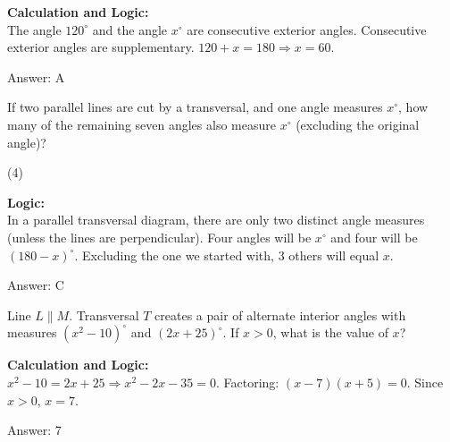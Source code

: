 \documentclass[11pt,paper=a4,answers]{exam}
\begin{document}
\begin{questions}
\begin{solution}
\textbf{Calculation and Logic:} \\
The angle $120^\circ$ and the angle $x^\circ$ are consecutive exterior angles. Consecutive exterior angles are supplementary. $120 + x = 180 \Rightarrow x = 60$.

\vspace{30pt}

Answer: \colorbox{yellow!100}{A}
\end{solution}

\vspace{60pt}

\question
If two parallel lines are cut by a transversal, and one angle measures $x^\circ$, how many of the remaining seven angles also measure $x^\circ$ (excluding the original angle)?
\begin{tasks}(4)
\end{tasks}

\begin{solution}
\textbf{Logic:} \\
In a parallel transversal diagram, there are only two distinct angle measures (unless the lines are perpendicular). Four angles will be $x^\circ$ and four will be $(180-x)^\circ$. Excluding the one we started with, 3 others will equal $x$.

\vspace{30pt}

Answer: \colorbox{yellow!100}{C}
\end{solution}

\vspace{60pt}

\question
Line $L \parallel M$. Transversal $T$ creates a pair of alternate interior angles with measures $(x^2 - 10)^\circ$ and $(2x + 25)^\circ$. If $x > 0$, what is the value of $x$?

\begin{solution}
\textbf{Calculation and Logic:} \\
$x^2 - 10 = 2x + 25 \Rightarrow x^2 - 2x - 35 = 0$. Factoring: $(x - 7)(x + 5) = 0$. Since $x > 0$, $x = 7$.

\vspace{30pt}

Answer: \colorbox{yellow!100}{7}
\end{solution}


\end{questions}
\end{document}
